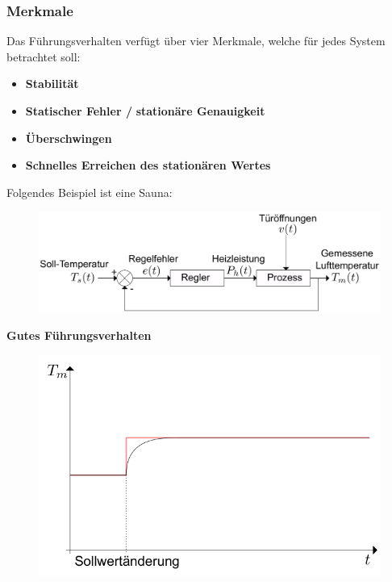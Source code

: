 \documentclass[
  10pt,
  a4paper,
]{article}
\providecommand{\tightlist}{%
  \setlength{\itemsep}{0pt}\setlength{\parskip}{0pt}}\usepackage{longtable,booktabs,array}
\numberwithin{equation}{section}
\begin{document}
\begin{multicols}{2}
{\subsubsection{Merkmale}\label{merkmale}}

Das Führungsverhalten verfügt über vier Merkmale, welche für jedes
System betrachtet soll:

\begin{itemize}
\tightlist
\item
  \textbf{Stabilität}
\item
  \textbf{Statischer Fehler /} \textbf{stationäre Genauigkeit}
\item
  \textbf{Überschwingen}
\item
  \textbf{Schnelles Erreichen des stationären Wertes}
\end{itemize}

Folgendes Beispiel ist eine Sauna:

\begin{figure}[H]

{\centering \includegraphics{images/block_diagramm_sauna.png}

}

\end{figure}

\textbf{Gutes Führungsverhalten}

\begin{figure}[H]

{\centering \includegraphics{images/fuhrungsverhalten/gutes_verhalten.png}

}
\end{figure}
\end{multicols}
\end{document}
